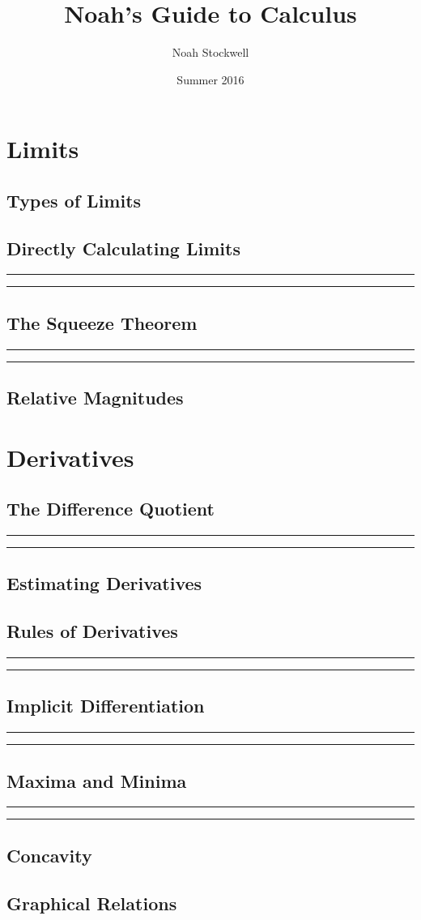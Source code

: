 \documentclass{article}
\title{Noah's Guide to Calculus}
\author{Noah Stockwell}
\date{Summer 2016}
\newcommand{\newchapter}[2]
{
	\subsection{#1}\noindent\rule[0.5ex]{\linewidth}{1pt}\newpage\noindent\rule[0.5ex]{\linewidth}{1pt}\newpage\newpage
}
\begin{document}
\maketitle
\vspace{2in}
\begin{center}\end{center}
\newpage

\newpage
\tableofcontents
\newpage
\section{Limits} 
\subsection{Types of Limits}  
\newchapter{Directly Calculating Limits}{DirectlyCalculatingLimits}
\newchapter{The Squeeze Theorem}{SqueezeTheorem}
\subsection{Relative Magnitudes} \newpage
\section{Derivatives} 
\newchapter{The Difference Quotient}{DifferenceQuotient}
\subsection{Estimating Derivatives}
\newchapter{Rules of Derivatives}{DerivativeRules}
\newchapter{Implicit Differentiation}{ImplicitDifferentiation}
\newchapter{Maxima and Minima}{MaxAndMin}
\subsection{Concavity} 
\subsection{Graphical Relations} 
\end{document}
